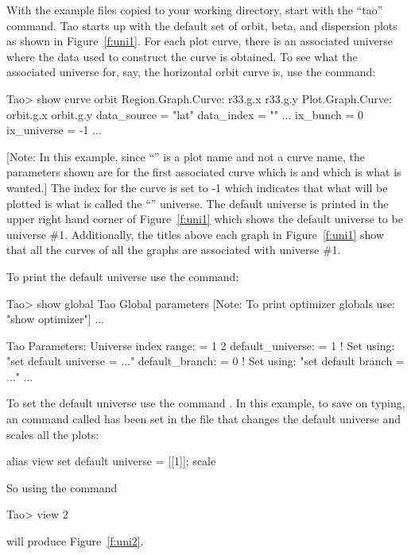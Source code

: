 \documentclass{hitec}     %
\begin{document}
With the example files copied to your working directory, start \tao with the ``tao'' command. Tao
starts up with the default set of orbit, beta, and dispersion plots as shown in Figure~\ref{f:uni1}.
For each plot curve, there is an associated universe where the data used to construct the curve is
obtained. To see what the associated universe for, say, the horizontal orbit curve is, use the
 command:
\begin{code}
Tao> show curve orbit
Region.Graph.Curve: r33.g.x
                    r33.g.y
Plot.Graph.Curve:   orbit.g.x
                    orbit.g.y
data_source          = "lat"
data_index           = ""
...
ix_bunch             = 0
ix_universe          = -1
...
\end{code}
[Note: In this example, since ``'' is a plot name and not a curve name, the parameters
shown are for the first associated curve which is  and which is what is wanted.] The
 index for the curve is set to -1 which indicates that what will be plotted is what
is called the ``'' universe. The default universe is printed in the upper right hand
corner of Figure~\ref{f:uni1} which shows the default universe to be universe \#1. Additionally, the
titles above each graph in Figure~\ref{f:uni1} show that all the curves of all the graphs are
associated with universe \#1.

To print the default universe use the  command:
\begin{code}
Tao> show global
Tao Global parameters [Note: To print optimizer globals use: "show optimizer"]
  ...

Tao Parameters:
  Universe index range:        = 1  2
  default_universe:            = 1  ! Set using: "set default universe = ..."
  default_branch:              = 0  ! Set using: "set default branch = ..."
  ...
\end{code}
To set the default universe use the command . In this example, to save on typing, an
 command called  has been set in the  file that changes the default universe
and scales all the plots:
\begin{code}
alias view set default universe = [[1]]; scale
\end{code}
So using the command
\begin{code}
Tao> view 2
\end{code}
will produce Figure~\ref{f:uni2}.
\end{document}
